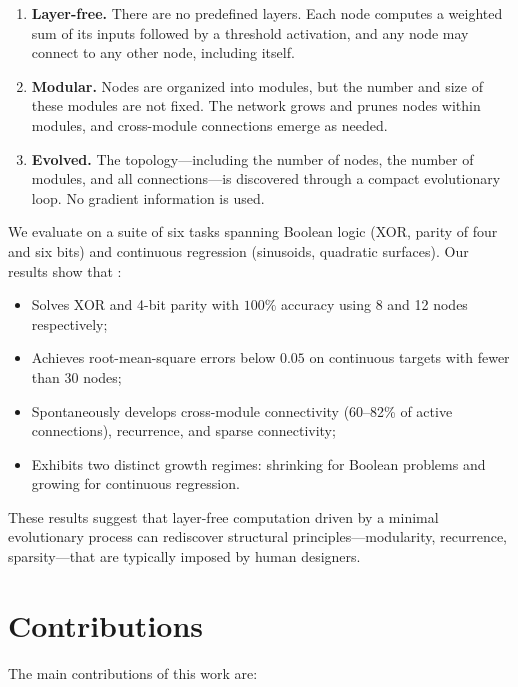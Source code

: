 \begin{enumerate}
  \item \textbf{Layer-free.} There are no predefined layers. Each node
    computes a weighted sum of its inputs followed by a threshold
    activation, and any node may connect to any other node, including
    itself.
  \item \textbf{Modular.} Nodes are organized into modules, but the
    number and size of these modules are not fixed. The network grows
    and prunes nodes within modules, and cross-module connections
    emerge as needed.
  \item \textbf{Evolved.} The topology—including the number of nodes,
    the number of modules, and all connections—is discovered through a
    compact evolutionary loop. No gradient information is used.
\end{enumerate}

We evaluate \modnet{} on a suite of six tasks spanning Boolean logic
(XOR, parity of four and six bits) and continuous regression
(sinusoids, quadratic surfaces). Our results show that \modnet{}:

\begin{itemize}
  \item Solves XOR and 4-bit parity with $100\%$ accuracy using 8 and
    12 nodes respectively;
  \item Achieves root-mean-square errors below $0.05$ on continuous
    targets with fewer than 30 nodes;
  \item Spontaneously develops cross-module connectivity (60--82\% of
    active connections), recurrence, and sparse connectivity;
  \item Exhibits two distinct growth regimes: shrinking for Boolean
    problems and growing for continuous regression.
\end{itemize}

These results suggest that layer-free computation driven by a minimal
evolutionary process can rediscover structural principles—modularity,
recurrence, sparsity—that are typically imposed by human designers.

\section{Contributions}

The main contributions of this work are:

